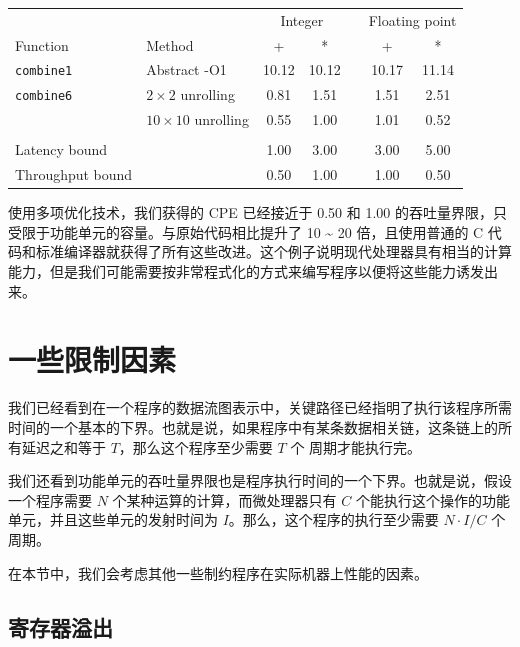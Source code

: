 \begin{table}[!ht]
    \centering
    \begin{tabular}{llccccc}
        \toprule
        & & \multicolumn{2}{c}{Integer} & & \multicolumn{2}{c}{Floating point} \\
        \cmidrule{3-4} \cmidrule{6-7}
        Function & Method & + & * & & + & * \\
        \midrule
        \texttt{combine1} & Abstract -O1 & 10.12 & 10.12 & & 10.17 & 11.14 \\
        \texttt{combine6} & $2 \times 2$ unrolling & 0.81 & 1.51 & & 1.51 & 2.51 \\
                        & $10 \times 10$ unrolling & 0.55 & 1.00 & & 1.01 & 0.52 \\
        \\
        Latency bound & & 1.00 & 3.00 & & 3.00 & 5.00 \\
        Throughput bound & & 0.50 & 1.00 & & 1.00 & 0.50 \\
        \bottomrule
    \end{tabular}
\end{table}

使用多项优化技术，我们获得的 CPE 已经接近于 0.50 和 1.00 的吞吐量界限，只受限于功能单元的容量。与原始代码相比提升了 10 \~{} 20 倍，且使用普通的 C 代码和标准编译器就获得了所有这些改进。这个例子说明现代处理器具有相当的计算能力，但是我们可能需要按非常程式化的方式来编写程序以便将这些能力诱发出来。

\section{一些限制因素}

我们已经看到在一个程序的数据流图表示中，关键路径已经指明了执行该程序所需时间的一个基本的下界。也就是说，如果程序中有某条数据相关链，这条链上的所有延迟之和等于 $T$，那么这个程序至少需要 $T$ 个 周期才能执行完。

我们还看到功能单元的吞吐量界限也是程序执行时间的一个下界。也就是说，假设一个程序需要 $N$ 个某种运算的计算，而微处理器只有 $C$ 个能执行这个操作的功能单元，并且这些单元的发射时间为 $I$。那么，这个程序的执行至少需要 $N \cdot I / C$ 个周期。

在本节中，我们会考虑其他一些制约程序在实际机器上性能的因素。

\subsection{寄存器溢出}

